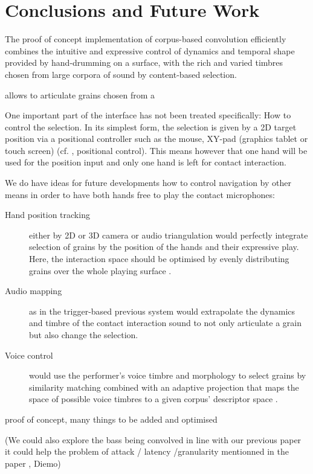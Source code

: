 \section{Conclusions and Future Work}

The proof of concept implementation of corpus-based convolution efficiently combines the intuitive and expressive control of dynamics and temporal shape provided by hand-drumming on a surface, with the rich and varied timbres chosen from large corpora of sound by content-based selection.

 allows to articulate grains chosen from a

One important part of the interface has not been treated specifically: How to control the selection.  In its simplest form, the selection is given by a 2D target position via a positional controller such as the mouse, XY-pad (graphics tablet or touch screen) (cf. \cite{Schwarz-nime2012-sound-space}, positional control).
This means however that one hand will be used for the position input and only one hand is left for contact interaction.

We do have ideas for future developments how to control navigation by other means in order to have both hands free to play the contact microphones:

\begin{description}
\item[Hand position tracking] either by 2D or 3D camera or audio triangulation would perfectly integrate selection of grains by the position of the hands and their expressive play.  Here, the interaction space should be optimised by evenly distributing grains over the whole playing surface \cite{LallemandSchwarz-dafx2011-distribute}.
\item[Audio mapping] as in the trigger-based previous system would extrapolate the dynamics and timbre of the contact interaction sound to not only articulate a grain but also change the selection.
\item[Voice control] would use the performer's voice timbre and morphology to select grains by similarity matching combined with an adaptive projection that maps the space of possible voice timbres to a given corpus' descriptor space \cite{StowellPlumbley-smc2010-timbre-remapping-regression-tree,Fasciani-si2013b}.
\end{description}

proof of concept, many things to be added and optimised

(We could also explore the bass being convolved in line with our previous paper it could help the problem of attack / latency /granularity mentionned in the paper \cite{TremblaySchwarz-nime2010-surfing-the-waves}, Diemo)
